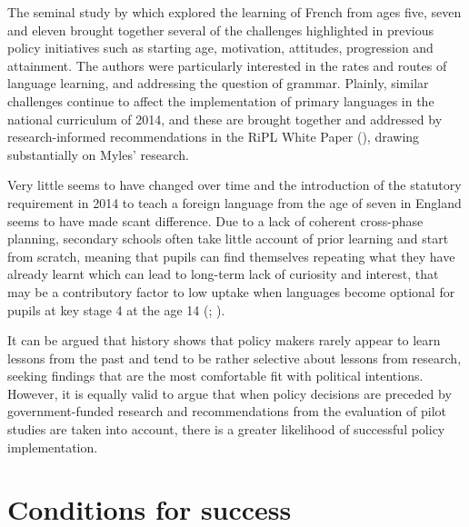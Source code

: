 \documentclass[output=paper]{langscibook}
\begin{document}
The seminal study by \citet{MylesMitchell2012} which explored the learning of French from ages five, seven and eleven brought together several of the challenges highlighted in previous policy initiatives such as starting age, motivation, attitudes, progression and attainment. The authors were particularly interested in the rates and routes of language learning, and addressing the question of grammar. Plainly, similar challenges continue to affect the implementation of primary languages in the national curriculum of 2014, and these are brought together and addressed by research-informed recommendations in the RiPL White Paper (\citealt{HolmesMyles2019}), drawing substantially on Myles’ research. 

Very little seems to have changed over time and the introduction of the statutory requirement in 2014 to teach a foreign language from the age of seven in England seems to have made scant difference. Due to a lack of coherent cross-phase planning, secondary schools often take little account of prior learning and start from scratch, meaning that pupils can find themselves repeating what they have already learnt which can lead to long-term lack of curiosity and interest, that may be a contributory factor to low uptake when languages become optional for pupils at key stage 4 at the age 14 (\citealt{TinsleyDoležal2018}; \citealt{HolmesMyles2019}).

It can be argued that history shows that policy makers rarely appear to learn lessons from the past and tend to be rather selective about lessons from research, seeking findings that are the most comfortable fit with political intentions. However, it is equally valid to argue that when policy decisions are preceded by government-funded research and recommendations from the evaluation of pilot studies are taken into account, there is a greater likelihood of successful policy implementation.

\section{Conditions for success}
\end{document}
